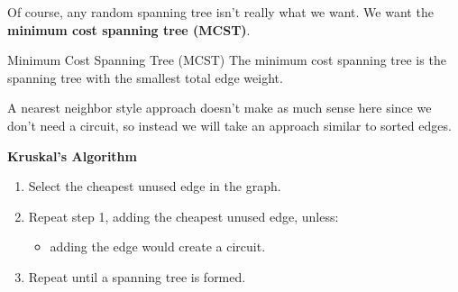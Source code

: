 Of course, any random spanning tree isn't really what we want.  We want the \textbf{minimum cost spanning tree (MCST)}.

\begin{definition}{Minimum Cost Spanning Tree (MCST)}{}
The minimum cost spanning tree is the spanning tree with the smallest total edge weight.  
\end{definition}


A nearest neighbor style approach doesn't make as much sense here since we don't need a circuit, so instead we will take an approach similar to sorted edges.

{\Large \textbf{Kruskal's Algorithm} } \\
\hspace{3in}
\begin{enumerate}
\item Select the cheapest unused edge in the graph.
\item Repeat step 1, adding the cheapest unused edge, unless:
\begin{itemize}
\item adding the edge would create a circuit.
\end{itemize}
\item Repeat until a spanning tree is formed.
\end{enumerate}



